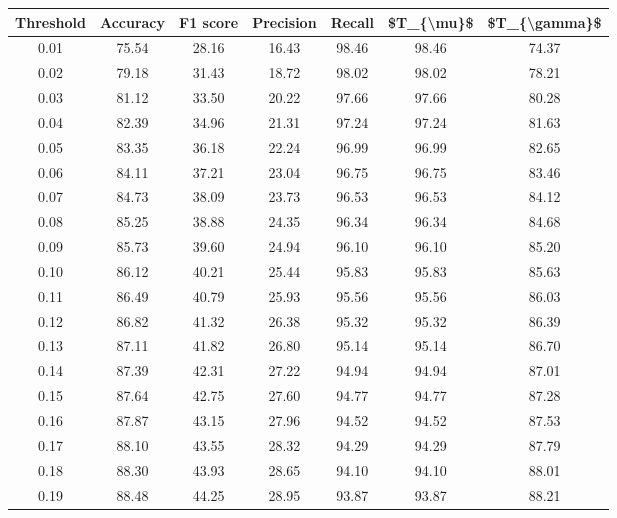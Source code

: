 \begin{tabular}{|c|c|c|c|c|c|c|}
\hline
 Threshold &  Accuracy &  F1 score &  Precision &  Recall &  \$T\_\{\textbackslash mu\}\$ &  \$T\_\{\textbackslash gamma\}\$ \\
\hline
      0.01 &     75.54 &     28.16 &      16.43 &   98.46 &      98.46 &         74.37 \\
      0.02 &     79.18 &     31.43 &      18.72 &   98.02 &      98.02 &         78.21 \\
      0.03 &     81.12 &     33.50 &      20.22 &   97.66 &      97.66 &         80.28 \\
      0.04 &     82.39 &     34.96 &      21.31 &   97.24 &      97.24 &         81.63 \\
      0.05 &     83.35 &     36.18 &      22.24 &   96.99 &      96.99 &         82.65 \\
      0.06 &     84.11 &     37.21 &      23.04 &   96.75 &      96.75 &         83.46 \\
      0.07 &     84.73 &     38.09 &      23.73 &   96.53 &      96.53 &         84.12 \\
      0.08 &     85.25 &     38.88 &      24.35 &   96.34 &      96.34 &         84.68 \\
      0.09 &     85.73 &     39.60 &      24.94 &   96.10 &      96.10 &         85.20 \\
      0.10 &     86.12 &     40.21 &      25.44 &   95.83 &      95.83 &         85.63 \\
      0.11 &     86.49 &     40.79 &      25.93 &   95.56 &      95.56 &         86.03 \\
      0.12 &     86.82 &     41.32 &      26.38 &   95.32 &      95.32 &         86.39 \\
      0.13 &     87.11 &     41.82 &      26.80 &   95.14 &      95.14 &         86.70 \\
      0.14 &     87.39 &     42.31 &      27.22 &   94.94 &      94.94 &         87.01 \\
      0.15 &     87.64 &     42.75 &      27.60 &   94.77 &      94.77 &         87.28 \\
      0.16 &     87.87 &     43.15 &      27.96 &   94.52 &      94.52 &         87.53 \\
      0.17 &     88.10 &     43.55 &      28.32 &   94.29 &      94.29 &         87.79 \\
      0.18 &     88.30 &     43.93 &      28.65 &   94.10 &      94.10 &         88.01 \\
      0.19 &     88.48 &     44.25 &      28.95 &   93.87 &      93.87 &         88.21 \\

\end{tabular}
